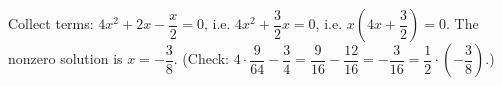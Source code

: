 Collect terms: $4x^2+2x-\dfrac x2=0$, i.e. $4x^2+\dfrac32x=0$, i.e. $x\left(4x+\dfrac32\right)=0$. The nonzero solution is $x=\boxed{-\dfrac38}$. (Check: $4\cdot\dfrac{9}{64}-\dfrac34=\dfrac{9}{16}-\dfrac{12}{16}=-\dfrac{3}{16}=\dfrac12\cdot\left(-\dfrac38\right)$.)
